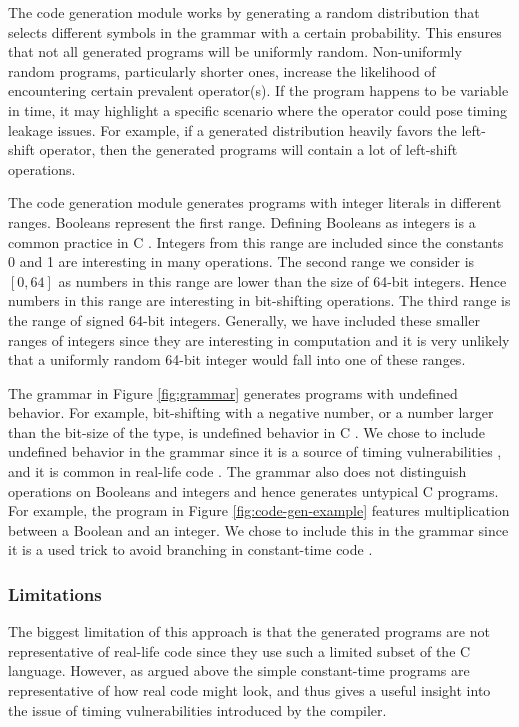 The code generation module works by generating a random distribution that selects different symbols in the grammar with a certain probability.
This ensures that not all generated programs will be uniformly random. 
Non-uniformly random programs, particularly shorter ones, increase the likelihood of encountering certain prevalent operator(s).
If the program happens to be variable in time, it may highlight a specific scenario where the operator could pose timing leakage issues.
For example, if a generated distribution heavily favors the left-shift operator, then the generated programs will contain a lot of left-shift operations.

The code generation module generates programs with integer literals in different ranges. 
Booleans represent the first range.
Defining Booleans as integers is a common practice in C \citep{c-standard}.
Integers from this range are included since the constants 0 and 1 are interesting in many operations.
The second range we consider is $[0, 64]$ as numbers in this range are lower than the size of 64-bit integers.
Hence numbers in this range are interesting in bit-shifting operations.
The third range is the range of signed 64-bit integers.
Generally, we have included these smaller ranges of integers since they are interesting in computation and it is very unlikely that a uniformly random 64-bit integer would fall into one of these ranges.

The grammar in Figure \ref{fig:grammar} generates programs with undefined behavior.
For example, bit-shifting with a negative number, or a number larger than the bit-size of the type, is undefined behavior in C \citep{c-standard}.
We chose to include undefined behavior in the grammar since it is a source of timing vulnerabilities \citep{what-you-c}, and it is common in real-life code \citep{undefined-behavior-c}.
The grammar also does not distinguish operations on Booleans and integers and hence generates untypical C programs.
For example, the program in Figure \ref{fig:code-gen-example} features multiplication between a Boolean and an integer.
We chose to include this in the grammar since it is a used trick to avoid branching in constant-time code \citep{fact,what-you-c}.

\subsubsection{Limitations}
The biggest limitation of this approach is that the generated programs are not representative of real-life code since they use such a limited subset of the C language.
However, as argued above the simple constant-time programs are representative of how real code might look, and thus gives a useful insight into the issue of timing vulnerabilities introduced by the compiler.